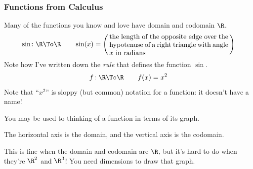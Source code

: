 \begin{frame}
\frametitle{Functions from Calculus}

Many of the functions you know and love have domain and codomain $\R$.
\pause
\abovedisplayskip=2mm\abovedisplayshortskip=2mm\belowdisplayskip=2mm
\[ \sin\colon\R\To\R \qquad \sin(x) =
  \left(\,\parbox{.5\textwidth}{
    the length of the opposite edge over the hypotenuse of a right
    triangle with angle $x$ in radians}\,\right) \]
\pause
Note how I've written down the \emph{rule} that defines the function $\sin$.
\pause
\[ f\colon\R\To\R \qquad f(x) = x^2 \]
\pause
Note that ``$x^2$'' is sloppy (but common) notation for a function: it doesn't
have a name!

\pause\bigskip
You may be used to thinking of a function in terms of its graph.
\medskip

\hfill
{}
\hfill
\begin{minipage}[c]{.5\textwidth}\raggedright
  \pause
  The horizontal axis is the domain, and the vertical axis is the codomain.

  \pause\medskip
  This is fine when the domain and codomain are $\R$, but it's hard to do when
  they're $\R^2$ and $\R^3$!
  \pause
  You need
  dimensions to draw that graph.

\end{minipage}
\hfill\null

\end{frame}



